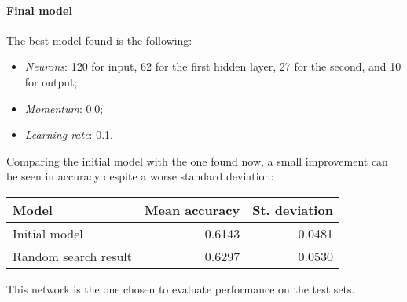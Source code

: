 \paragraph{Final model}
The best model found is the following: 
\begin{itemize}
    \item \emph{Neurons}: 120 for input, 62 for the first hidden layer, 27 for the second, and 10 for output; 
    \item \emph{Momentum}: 0.0;
    \item \emph{Learning rate}: 0.1.
\end{itemize}
Comparing the initial model with the one found now, a small improvement 
can be seen in accuracy despite a worse standard deviation:
\begin{center}
    \begin{tabular}{ |l|r|r| } 
        \hline
        Model & Mean accuracy & St. deviation \\
        \hline
        Initial model & 0.6143 & 0.0481\\
        Random search result & 0.6297 & 0.0530 \\
        \hline
    \end{tabular}
\end{center}
This network is the one chosen to evaluate performance on the test sets.
\newpage